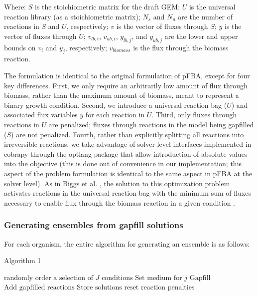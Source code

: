 \documentclass[11pt,twocolumn,notitlepage,openany,twoside]{book}
\begin{document}
\begin{refsection}
Where:
  $S$ is the stoichiometric matrix for the draft GEM;
	$U$ is the universal reaction library (as a stoichiometric matrix);
	$N_s$ and $N_u$ are the number of reactions in $S$ and $U$, respectively;
	$v$ is the vector of fluxes through $S$;
 	$y$ is the vector of fluxes through $U$;
	$v_{lb,i}$, $v_{ub,i}$, $y_{lb,j}$, and $y_{ub,j}$ are the lower and upper bounds on $v_i$ and $y_j$, respectively;
	$v_{biomass}$ is the flux through the biomass reaction.

The formulation is identical to the original formulation of pFBA, except for four key differences. First, we only require an arbitrarily low amount of flux through biomass, rather than the maximum amount of biomass, meant to represent a binary growth condition. Second, we introduce a universal reaction bag ($U$) and associated flux variables $y$ for each reaction in $U$. Third, only fluxes through reactions in $U$ are penalized; fluxes through reactions in the model being gapfilled ($S$) are not penalized. Fourth, rather than explicitly splitting all reactions into irreversible reactions, we take advantage of solver-level interfaces implemented in cobrapy through the optlang package \cite{Jensen2016-nu} that allow introduction of absolute values into the objective (this is done out of convenience in our implementation; this aspect of the problem formulation is identical to the same aspect in pFBA at the solver level). As in Biggs et al. , the solution to this optimization problem activates reactions in the universal reaction bag with the minimum sum of fluxes necessary to enable flux through the biomass reaction in a given condition \cite{Biggs2017-md}.

\subsubsection{Generating ensembles from gapfill solutions}

For each organism, the entire algorithm for generating an ensemble is as follows:

\begin{algorithm}
  \caption{Algorithm 1}
  \begin{algorithmic}[1]
        \State $\mbox{randomly order a selection of $J$ conditions}$
          \State $\mbox{Set medium for $j$}$
          \State $\mbox{Gapfill}$
          \State $\mbox{Add gapfilled reactions}$
        \EndFor
        \State $\mbox{Store solutions}$
        \State $\mbox{reset reaction penalties}$
      \EndFor
    \EndProcedure
  \end{algorithmic}
\end{algorithm}


\end{refsection}
\end{document}
